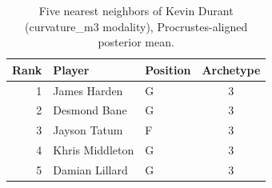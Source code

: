 \begin{table}[htbp]
  \centering\small
  \begin{tabular}{rllc}
    \toprule
    Rank & Player & Position & Archetype \\
    \midrule
    1 & James Harden & G & 3 \\
    2 & Desmond Bane & G & 3 \\
    3 & Jayson Tatum & F & 3 \\
    4 & Khris Middleton & G & 3 \\
    5 & Damian Lillard & G & 3 \\
    \bottomrule
  \end{tabular}
  \caption{Five nearest neighbors of Kevin Durant (curvature_m3 modality), Procrustes-aligned posterior mean.}
  \label{tab:Kevin_Durant_neighbors_curvature_m3}
\end{table}

